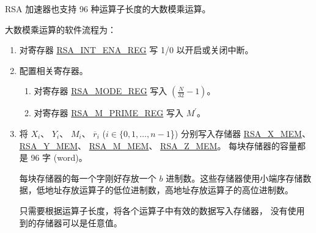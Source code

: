 \documentclass[main\_\_CN.tex]{subfiles}
\begin{document}
RSA 加速器也支持 96 种运算子长度的大数模乘运算。

大数模乘运算的软件流程为：

\begin{enumerate}

    \item 对寄存器 \hyperref[regdesc:RSAINTENAREG]{RSA\_INT\_ENA\_REG} 写 1/0 以开启或关闭中断。

    \item 配置相关寄存器。

    \begin{enumerate}
        \item 对寄存器 \hyperref[regdesc:RSAMODEREG]{RSA\_MODE\_REG} 写入 \begin{math}( \frac{N}{32} - 1 )\end{math}。

        \item 对寄存器 \hyperref[regdesc:RSAMPRIMEREG]{RSA\_M\_PRIME\_REG} 写入 \begin{math}M^{\prime}\end{math}。

    \end{enumerate}

    \item 将
        \begin{math}X_{i}\end{math}、
        \begin{math}Y_{i}\end{math}、
        \begin{math}M_{i}\end{math}、
        \begin{math}\overline{r}_{i}\end{math}
        (\begin{math}i \in \{0, 1, \dots, n-1\end{math}\})
        分别写入存储器
        \hyperref[regdesc:RSAmemory]{RSA\_X\_MEM}、
        \hyperref[regdesc:RSAmemory]{RSA\_Y\_MEM}、
        \hyperref[regdesc:RSAmemory]{RSA\_M\_MEM}、
        \hyperref[regdesc:RSAmemory]{RSA\_Z\_MEM}。
        每块存储器的容量都是 96 字 (word)。

        每块存储器的每一个字刚好存放一个 \begin{math}b\end{math} 进制数。这些存储器使用小端序存储数据，低地址存放运算子的低位进制数，高地址存放运算子的高位进制数。

        只需要根据运算子长度，将各个运算子中有效的数据写入存储器，
        没有使用到的存储器可以是任意值。


\end{enumerate}
\end{document}

